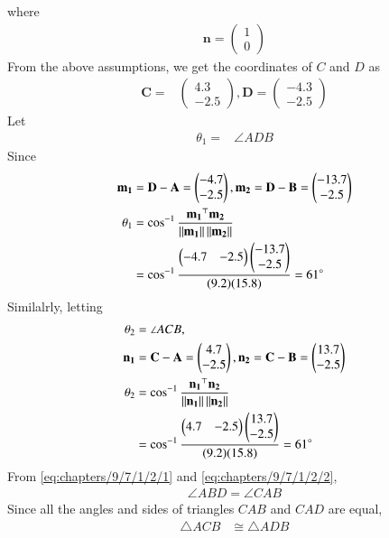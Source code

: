 \documentclass{article}
\providecommand{\norm}[1]{\left\lVert#1\right\rVert}
\newcommand{\myvec}[1]{\ensuremath{\begin{pmatrix}#1\end{pmatrix}}}
\let\vec\mathbf
\begin{document}
where
\begin{align}
\vec{n} = \myvec{1\\0}
\end{align}
  From the above assumptions, we get the coordinates of $C$ and $D$ as
  \begin{align}
\vec{C} =& \myvec{4.3\\-2.5},\vec{D} = \myvec{-4.3\\-2.5}
  \end{align}
Let 
    \begin{align}
\theta_1=&\angle ADB
    \end{align}
    Since
    \begin{align}
\vec{m_1}&=\vec{D}-\vec{A}=\myvec{-4.7\\-2.5}, \vec{m_2}=\vec{D}-\vec{B}=\myvec{-13.7\\-2.5}\\
\theta_1&=\cos^{-1}\frac{\vec{m_1}^\top\vec{m_2}}{\norm{\vec{m_1}}\norm{\vec{m_2}}}\\
&=\cos^{-1}\frac{\myvec{-4.7&-2.5}\myvec{-13.7\\-2.5}}{(9.2)(15.8)}=61\degree 
\label{eq:chapters/9/7/1/2/1}
    \end{align}
    Similalrly, letting
    \begin{align}
	    \theta_2&=\angle ACB,\\
\vec{n_1}&=\vec{C}-\vec{A}=\myvec{4.7\\-2.5}, \vec{n_2}=\vec{C}-\vec{B}=\myvec{13.7\\-2.5}\\
\theta_2 &=\cos^{-1}\frac{\vec{n_1}^\top\vec{n_2}}{\norm{\vec{n_1}}\norm{\vec{n_2}}}\\
&=\cos^{-1}\frac{\myvec{4.7&-2.5}\myvec{13.7\\-2.5}}{(9.2)(15.8)}=61\degree 
\label{eq:chapters/9/7/1/2/2}
\end{align}
From \eqref{eq:chapters/9/7/1/2/1} and \eqref{eq:chapters/9/7/1/2/2},
\begin{align}
\angle ABD = \angle CAB 
\end{align}
Since all the angles and sides of triangles $CAB$ and $CAD$ are equal,
\begin{align}
    \triangle{ACB} & \cong \triangle{ADB}
\end{align}
\end{document}

